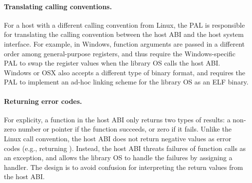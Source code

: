 



\paragraph{Translating calling conventions.}
For a host with a different calling convention from Linux,
the PAL is responsible for translating the calling convention between the host ABI and the host system interface.
For example,
in Windows, function arguments are passed in a different order among general-purpose registers,
and thus require the Windows-specific PAL
to swap the register values when the library OS calls the host ABI.
Windows or OSX also accepts a different type of binary format,
and requires the PAL to implement an ad-hoc linking scheme for the library OS as an ELF binary.




\paragraph{Returning error codes.}
For explicity, a function in the host ABI only returns two types of results:
a non-zero number or pointer if the function succeeds, or zero if it fails.
Unlike the Linux call convention, the host ABI does not return negative values as error codes (e.g., returning ).
Instead, the host ABI threats failures of function calls
as an exception, and allows the library OS to handle the failures by assigning a handler.
The design is to avoid confusion
for interpreting the return values from the host ABI.







